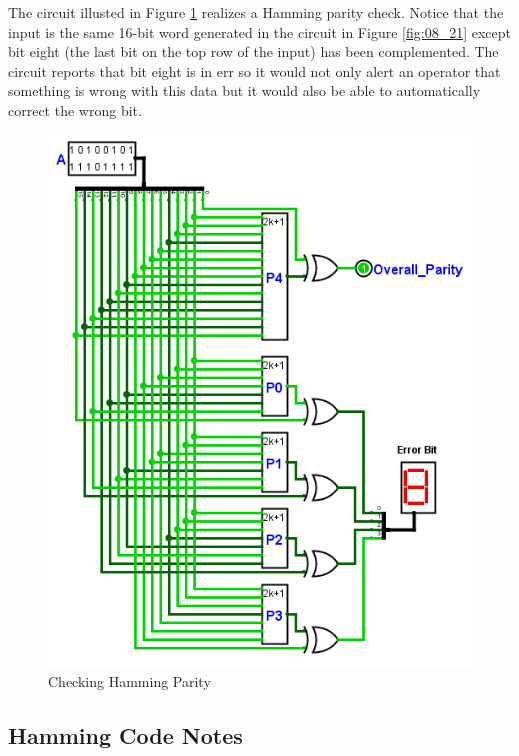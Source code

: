 The circuit illusted in Figure \ref{fig:08_22} realizes a Hamming parity check. Notice that the input is the same 16-bit word generated in the circuit in Figure \ref{fig:08_21} except bit eight (the last bit on the top row of the input) has been complemented. The circuit reports that bit eight is in err so it would not only alert an operator that something is wrong with this data but it would also be able to automatically correct the wrong bit.

\begin{figure}[H]
	\centering
	\includegraphics[width=\maxwidth{.95\linewidth}]{gfx/08_22}
	\caption{Checking Hamming Parity}
	\label{fig:08_22}
\end{figure}


\subsection{Hamming Code Notes}
\label{CL:subsec:hamming_code_notes}

